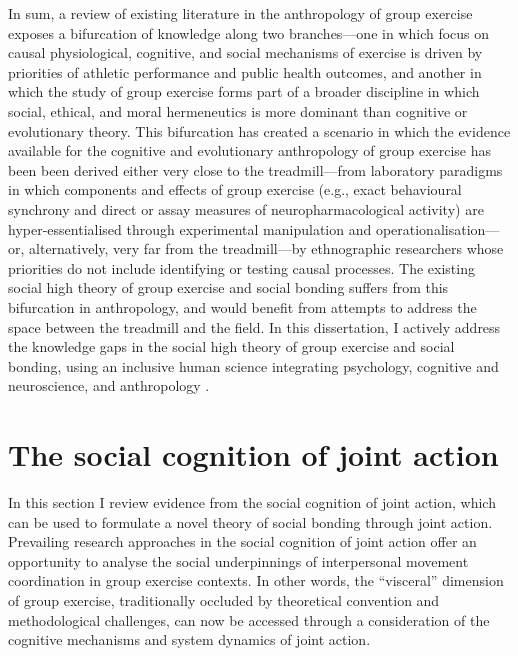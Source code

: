 \begin{CJK}{UTF8}{gbsn}
In sum, a review of existing literature in the anthropology of group exercise exposes a bifurcation of knowledge along two branches---one in which focus on causal physiological, cognitive, and social mechanisms of exercise is driven by priorities of athletic performance and public health outcomes, and another in which the study of group exercise forms part of a broader discipline in which social, ethical, and moral hermeneutics is more dominant than cognitive or evolutionary theory.  This bifurcation has created a scenario in which the evidence available for the cognitive and evolutionary anthropology of group exercise has been been derived either very close to the treadmill---from laboratory paradigms in which components and effects of group exercise (e.g., exact behavioural synchrony and direct or assay measures of neuropharmacological activity) are hyper-essentialised through experimental manipulation and operationalisation---or, alternatively, very far from the treadmill---by ethnographic researchers whose priorities do not include identifying or testing causal processes.  The existing social high theory of group exercise and social bonding suffers from this bifurcation in anthropology, and would benefit from attempts to address the space between the treadmill and the field.  In this dissertation, I actively address the knowledge gaps in the social high theory of group exercise and social bonding, using an inclusive human science integrating psychology, cognitive and neuroscience, and anthropology \citep{Whitehouse2012,Downey2014}.


\section{The social cognition of joint action}

In this section I review evidence from the social cognition of joint action, which can be used to formulate a novel theory of social bonding through joint action.  Prevailing research approaches in the social cognition of joint action offer an opportunity to analyse the social underpinnings of interpersonal movement coordination in group exercise contexts.   In other words, the ``visceral'' dimension of group exercise, traditionally occluded by theoretical convention and methodological challenges, can now be accessed through a consideration of the cognitive mechanisms and system dynamics of joint action.


\end{CJK}
